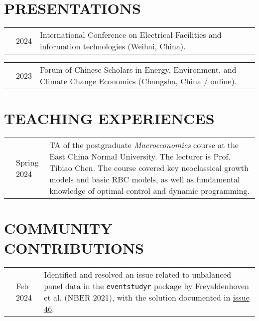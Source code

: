 \documentclass[10pt, letterpaper]{article}
\begin{document}
\section{PRESENTATIONS}

\vspace{.2cm}
\begin{tabularx}{\textwidth}{@{}p{.2cm} @{}p{1cm} X@{}}
& 2024 & International Conference on Electrical Facilities and information technologies (Weihai, China).
\end{tabularx}

\vspace{.2cm}

\begin{tabularx}{\textwidth}{@{}p{.2cm} @{}p{1cm} X@{}}
& 2023 & Forum of Chinese Scholars in Energy, Environment, and Climate Change Economics (Changsha, China / online).
\end{tabularx}

\vspace{.2cm}



\section{TEACHING EXPERIENCES}

\vspace{.2cm}
\begin{tabularx}{\textwidth}{@{}p{.2cm} @{}p{2cm} X@{}}
	& Spring 2024 & TA of the postgraduate \textit{Macroeconomics} course at the East China Normal University. The lecturer is Prof. Tibiao Chen. The course covered key neoclassical growth models and basic RBC models, as well as fundamental knowledge of optimal control and dynamic programming.
\end{tabularx}


\section{COMMUNITY CONTRIBUTIONS}

\vspace{.2cm}
\begin{tabularx}{\textwidth}{@{}p{.2cm} @{}p{2cm} X@{}}
	& Feb 2024 & Identified and resolved an issue related to unbalanced panel data in the \texttt{eventstudyr} package by Freyaldenhoven et al. (NBER 2021), with the solution documented in \href{https://github.com/JMSLab/eventstudyr/issues/46}{issue 46}.
\end{tabularx}
\end{document}
